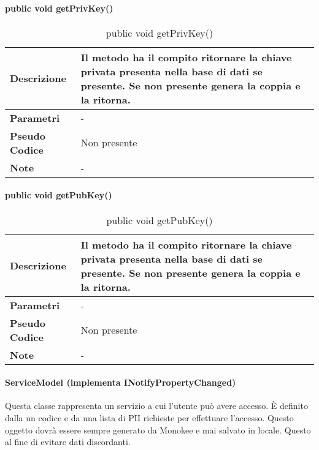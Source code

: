 \paragraph{public void getPrivKey()}
\begin{center}
    \begin{longtable}{|p{3cm}|p{9cm}|}%
    \caption{public void getPrivKey()}
    \endfirsthead
    \endhead
    \hline
    \textbf{Descrizione} & Il metodo ha il compito ritornare la chiave privata presenta nella base di dati se presente. Se non presente genera la coppia e la ritorna.\\
    \hline
    \textbf{Parametri} &      
    -
    \\
    \hline
    \textbf{Pseudo Codice} & 
    Non presente
    \\
    \hline
    \textbf{Note} & 
    -
    \\
    \hline
    \end{longtable}
    \end{center}



\paragraph{public void getPubKey()}
\begin{center}
    \begin{longtable}{|p{3cm}|p{9cm}|}%
    \caption{public void getPubKey()}
    \endfirsthead
    \endhead
    \hline
    \textbf{Descrizione} & Il metodo ha il compito ritornare la chiave privata presenta nella base di dati se presente. Se non presente genera la coppia e la ritorna.\\
    \hline
    \textbf{Parametri} &      
    -
    \\
    \hline
    \textbf{Pseudo Codice} & 
    Non presente
    \\
    \hline
    \textbf{Note} & 
    -
    \\
    \hline
    \end{longtable}
    \end{center}

\paragraph{ServiceModel (implementa INotifyPropertyChanged)}
Questa classe rappresenta un servizio a cui l’utente può avere accesso. È definito dalla un codice e da una lista di PII richieste per effettuare l’accesso. Questo oggetto dovrà essere sempre generato da Monokee e mai salvato in locale. Questo al fine di evitare dati discordanti.
